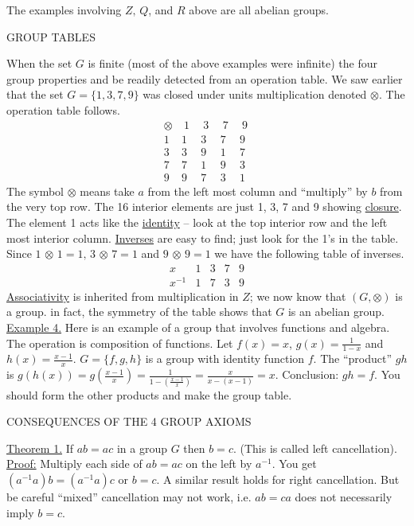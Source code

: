 \documentclass[12pt]{article}
\theoremstyle{definition}
\begin{document}
The examples involving $Z,\, Q$, and $R$ above are all abelian groups.

\centerline{GROUP TABLES}
\rule{0in}{.1in}
When the set $G$ is finite (most of the above examples were infinite) the four group properties and be readily detected from an operation table. We saw earlier that the set $G=\{1,3,7,9\}$ was closed under units multiplication denoted $\otimes$.  The operation table follows.
$$\begin{array}{c|cccc}
\otimes & ~1~& ~3~ & ~7~ & ~9~\\
\hline
1 & 1 & 3 & 7 & 9\\
3 & 3 & 9 & 1 & 7\\
7 & 7 & 1 & 9 & 3\\
9 & 9 & 7 & 3 & 1
\end{array}$$
The symbol $\otimes$ means take $a$ from the left most column and ``multiply'' by $b$ from the very top row.  The 16 interior elements are just 1, 3, 7 and 9 showing \underline{closure}.  The element 1 acts like the \underline{identity}  -- look at the top interior row and the left most interior column.  \underline{Inverses} are easy to find;  just look for the 1's in the table.  Since $1\,\otimes\, 1=1,\,3\,\otimes\,7=1$ and  $9\,\otimes\,9=1$ we have the following table of inverses.
$$\begin{array}{c|cccc}
x & 1 & 3 & 7 & 9\\
\hline
x^{-1} & 1 & 7 & 3 & 9
\end{array}$$
\underline{Associativity} is inherited from multiplication in $Z$; we now know that $(G,\otimes)$ is a group.  in fact, the symmetry of the table shows that $G$ is an abelian group.\\[.1in]
\underline{Example 4.}  Here is an example of a group that involves functions and algebra.  The operation is composition of functions.  Let $f(x)=x$, $g(x)=\frac{1}{1-x}$ and $h(x)=\frac{x-1}{x}$.  $G=\{f,g,h\}$ is a group with identity function $f$.  The ``product'' $gh$ is $g(h(x))=g(\frac{x-1}{x})=\frac{1}{1-(\frac{x-1}{x})}=\frac{x}{x-(x-1)}=x$.  Conclusion: $gh=f$.  You should form the other products and make the group table.\\%
\newpage%
\centerline{CONSEQUENCES OF THE 4 GROUP AXIOMS}
%
\underline{Theorem 1.} If $ab=ac$ in a group $G$ then $b=c$.  (This is called left cancellation).\\
\underline{Proof:}  Multiply each side of $ab=ac$ on the left by $a^{-1}$.  You get $(a^{-1}a)b=(a^{-1}a)c$ or $b=c$.  A similar result holds for right cancellation.  But be careful ``mixed'' cancellation may not work, i.e. $ab=ca$ does not necessarily imply $b=c$.\\[.1in]
\end{document}
